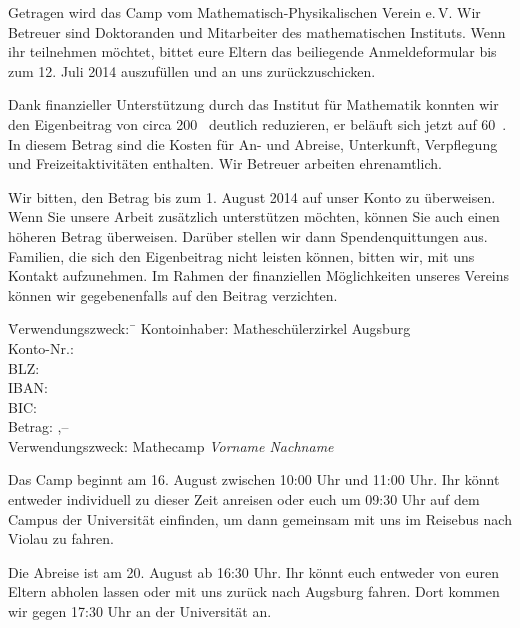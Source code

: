 \documentclass{zettel}
\begin{document}
Getragen wird das Camp vom Mathematisch-Physikalischen Verein e.\,V. Wir
Betreuer sind Doktoranden und Mitarbeiter des mathematischen Instituts.
Wenn ihr teilnehmen möchtet, bittet eure Eltern das beiliegende Anmeldeformular
bis zum 12. Juli 2014 auszufüllen und an uns zurückzuschicken.
\vspace{\medskipamount}

\begin{minipage}{0.54\textwidth}
Dank finanzieller Unterstützung durch das Institut für Mathematik konnten wir
den Eigenbeitrag von circa 200~\texteuro{} deutlich reduzieren, er beläuft sich
jetzt auf 60~\texteuro. In diesem Betrag sind die Kosten für An- und Abreise,
Unterkunft, Verpflegung und Freizeitaktivitäten enthalten. Wir Betreuer
arbeiten ehrenamtlich.
\end{minipage}

\newpage

Wir bitten, den Betrag bis zum 1. August 2014 auf
unser Konto zu überweisen. Wenn Sie unsere Arbeit zusätzlich unterstützen
möchten, können Sie auch einen höheren Betrag überweisen. Darüber stellen wir
dann Spendenquittungen aus. Familien, die sich den
Eigenbeitrag nicht leisten können, bitten wir, mit uns Kontakt aufzunehmen. Im
Rahmen der finanziellen Möglichkeiten unseres Vereins können wir gegebenenfalls
auf den Beitrag verzichten.

\vspace{-0.7em}
\begin{tabbing}
  \qquad\qquad \= Verwendungszweck:\, \= \kill
  \> Kontoinhaber: \> Matheschülerzirkel Augsburg \\
  \> Konto-Nr.:  \\
  \> BLZ:  \\
  \> IBAN:  \\
  \> BIC:  \\
  \> Betrag: ,-- \texteuro \\
  \> Verwendungszweck: \> Mathecamp \emph{Vorname Nachname}
\end{tabbing}
\vspace{-0.7em}

Das Camp beginnt am 16. August zwischen 10:00 Uhr und 11:00 Uhr. Ihr könnt
entweder individuell zu dieser Zeit anreisen oder euch um 09:30 Uhr auf dem Campus der
Universität einfinden, um dann gemeinsam mit uns im Reisebus nach Violau zu fahren.

Die Abreise ist am 20. August ab 16:30 Uhr. Ihr könnt euch entweder von euren
Eltern abholen lassen oder mit uns zurück nach Augsburg fahren. Dort kommen wir
gegen 17:30 Uhr an der Universität an.
\end{document}
